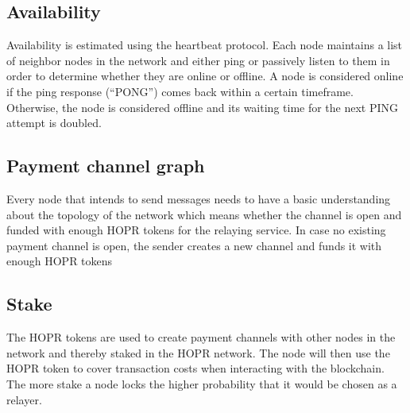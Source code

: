 \subsection{Availability}
Availability is estimated using the heartbeat protocol.
Each node maintains a list of neighbor nodes in the network and either ping or passively listen to them in order to determine whether they are online or offline.
A node is considered online if the ping response (“PONG”) comes back within a certain timeframe. Otherwise, the node is considered offline and its waiting time for the next PING attempt is doubled.


\subsection{Payment channel graph}
Every node that intends to send messages needs to have a basic understanding about the topology of the network which means whether the channel is open and funded with enough HOPR tokens for the relaying service. In case no existing payment channel is open, the sender creates a new channel and funds it with enough HOPR tokens

\subsection{Stake}
The HOPR tokens are used to create payment channels with other nodes in the network and thereby staked in the HOPR network. The node will then use the HOPR token to cover transaction costs when interacting with the blockchain. The more stake a node locks the higher probability that it would be chosen as a relayer.

